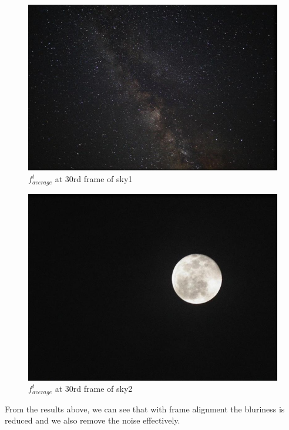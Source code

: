 \documentclass[
	12pt, %
]{fphw}
\begin{document}
\begin{figure}[H]
 
	\centering
	\includegraphics[width=1\columnwidth]{T1/result/sky1wialign_30.jpg} %
	\caption{$f^t_{average}$ at 30rd frame of sky\underline{\hspace{0.5em}}1}
	\label{fig5}
	 
\end{figure}

\begin{figure}[H]
 
	\centering
	\includegraphics[width=1\columnwidth]{T1/result/sky2wialign_30.jpg} %
	\caption{$f^t_{average}$ at 30rd frame of sky\underline{\hspace{0.5em}}2}
	\label{fig6}
	 
\end{figure}
From the results above, we can see that with frame alignment the bluriness is reduced and we also remove the noise effectively.
\end{document}
